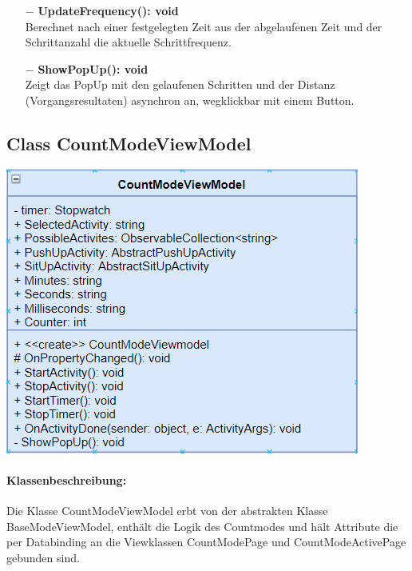 \documentclass[a4paper,12pt]{article}
\begin{document}
\begin{itemize}
	\item[$-$] \textbf{UpdateFrequency(): void} \\ Berechnet nach einer festgelegten Zeit aus der abgelaufenen Zeit und der Schrittanzahl die aktuelle Schrittfrequenz.
	\item[$-$] \textbf{ShowPopUp(): void} \\ Zeigt das PopUp mit den gelaufenen Schritten und der Distanz (Vorgangsresultaten) asynchron an, wegklickbar mit einem Button.
\end{itemize}


	\subsection{Class CountModeViewModel}

	\includegraphics{bilder/ViewModelKlassen/CountModeViewModel}

\paragraph{Klassenbeschreibung:}
Die Klasse CountModeViewModel erbt von der abstrakten Klasse BaseModeViewModel, enthält die Logik des Countmodes und hält Attribute die per Databinding an die Viewklassen CountModePage und CountModeActivePage gebunden sind.
\end{document}
